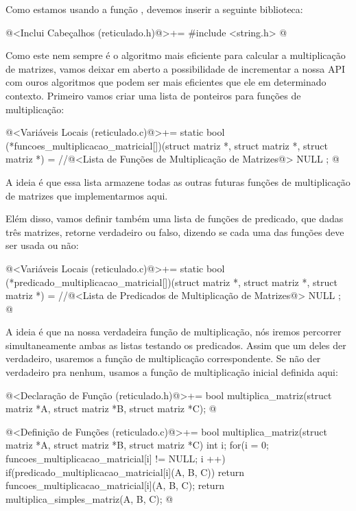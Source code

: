 Como estamos usando a função , devemos inserir a
seguinte biblioteca:

\iniciocodigo
@<Inclui Cabeçalhos (reticulado.h)@>+=
#include <string.h>
@
\fimcodigo

Como este nem sempre é o algoritmo mais eficiente para calcular a
multiplicação de matrizes, vamos deixar em aberto a possibilidade de
incrementar a nossa API com ouros algoritmos que podem ser mais
eficientes que ele em determinado contexto. Primeiro vamos criar uma
lista de ponteiros para funções de multiplicação:

\iniciocodigo
@<Variáveis Locais (reticulado.c)@>+=
static bool (*funcoes_multiplicacao_matricial[])(struct matriz *,
                                                struct matriz *,
                                                struct matriz *) =
  {
    //@<Lista de Funções de Multiplicação de Matrizes@>
    NULL
  };
@
\fimcodigo

A ideia é que essa lista armazene todas as outras futuras funções de
multiplicação de matrizes que implementarmos aqui.

Elém disso, vamos definir também uma lista de funções de predicado,
que dadas três matrizes, retorne verdadeiro ou falso, dizendo se cada
uma das funções deve ser usada ou não:

\iniciocodigo
@<Variáveis Locais (reticulado.c)@>+=
static bool (*predicado_multiplicacao_matricial[])(struct matriz *,
                                                  struct matriz *,
                                                  struct matriz *) =
  {
    //@<Lista de Predicados de Multiplicação de Matrizes@>
    NULL
  };
@
\fimcodigo

A ideia é que na nossa verdadeira função de multiplicação, nós iremos
percorrer simultaneamente ambas as listas testando os
predicados. Assim que um deles der verdadeiro, usaremos a função de
multiplicação correspondente. Se não der verdadeiro pra nenhum, usamos
a função de multiplicação inicial definida aqui:

\iniciocodigo
@<Declaração de Função (reticulado.h)@>+=
bool multiplica_matriz(struct matriz *A, struct matriz *B,
                        struct matriz *C);
@
\fimcodigo

\iniciocodigo
@<Definição de Funções (reticulado.c)@>+=
bool multiplica_matriz(struct matriz *A, struct matriz *B,
                       struct matriz *C){
  int i;
  for(i = 0; funcoes_multiplicacao_matricial[i] != NULL; i ++)
    if(predicado_multiplicacao_matricial[i](A, B, C))
      return funcoes_multiplicacao_matricial[i](A, B, C);
  return multiplica_simples_matriz(A, B, C);
}
@
\fimcodigo

